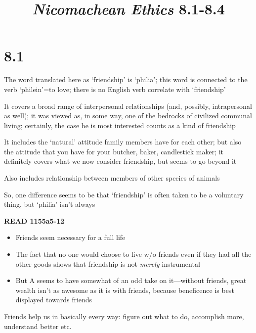 \documentclass[11pt]{article}
\title{\emph{Nicomachean Ethics} 8.1-8.4}
\author{}
\date{}
\begin{document}
\maketitle

\section*{8.1}

\noindent The word translated here as `friendship' is `philia'; this word is connected to the verb `philein'=to love; there is no English verb correlate with `friendship'
\vspace*{2mm}

\noindent It covers a broad range of interpersonal relationships (and, possibly, intrapersonal as well); it was viewed as, in some way, one of the bedrocks of civilized communal living; certainly, the case he is most interested counts as a kind of friendship
\vspace*{2mm}

\noindent It includes the `natural' attitude family members have for each other; but also the attitude that you have for your butcher, baker, candlestick maker; it definitely covers what we now consider friendship, but seems to go beyond it
\vspace*{2mm}

\noindent Also includes relationship between members of other species of animals
\vspace*{2mm}

\noindent So, one difference seems to be that `friendship' is often taken to be a voluntary thing, but `philia' isn't always
\vspace*{2mm}

\noindent\textbf{READ 1155a5-12}

\begin{itemize}\item{Friends seem necessary for a full life}\item{The fact that no one would choose to live w/o friends even if they had all the other goods shows that friendship is not \emph{merely} instrumental}\item{But A seems to have somewhat of an odd take on it---without friends, great wealth isn't as awesome as it is with friends, because beneficence is best displayed towards friends}\end{itemize}

\noindent Friends help us in basically every way: figure out what to do, accomplish more, understand better etc.
\vspace*{2mm}
\end{document}
